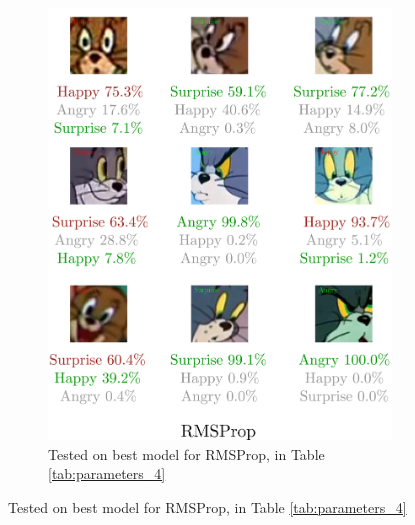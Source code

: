 \documentclass[report, 11pt, oneside]{dissertation}
\begin{document}
\begin{figure}[h]
	\centering
	\begin{subfigure}{0.54\textwidth}
		\includegraphics[scale=0.125]{figure_39.pdf}
		\caption{\tiny{Tested on best model for RMSProp, in Table \ref{tab:parameters_4}}}
	\end{subfigure}
	\label{fig:emotion_classification_rmsprop}
\end{figure}

\backmatter

\label{References}
\printbibliography[title={References}] %
\end{document}
